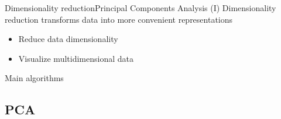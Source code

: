 \documentclass[10pt,compress]{beamer} %
\begin{document}
\begin{frame}{Dimensionality reduction}{Principal Components Analysis (I)}
	Dimensionality reduction transforms data into more convenient representations
	\begin{itemize}
		\item Reduce data dimensionality
		\item Visualize multidimensional data
	\end{itemize}

	Main algorithms

\end{frame}


\subsection{PCA}
\end{document}
